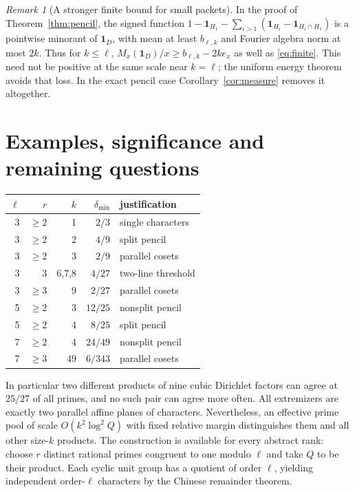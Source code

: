 \documentclass[11pt]{article}
\theoremstyle{remark}\newtheorem{remark}[theorem]{Remark}
\newcommand{\1}{\mathbf 1}
\begin{document}
\begin{remark}[A stronger finite bound for small packets]
In the proof of Theorem~\ref{thm:pencil}, the signed function $1-\1_{H_1}-\sum_{i>1}(\1_{H_i}-\1_{H_i\cap H_1})$ is a pointwise minorant of $\1_D$, with mean at least $b_{\ell,k}$ and Fourier algebra norm at most $2k$. Thus for $k\le\ell$, $M_x(\1_D)/x\ge b_{\ell,k}-2ke_x$ as well as \eqref{eq:finite}. This need not be positive at the same scale near $k=\ell$; the uniform energy theorem avoids that loss. In the exact pencil case Corollary~\ref{cor:measure} removes it altogether.
\end{remark}

\section{Examples, significance and remaining questions}
\begin{center}
\begin{tabular}{rrrrl}
\toprule
$\ell$ & $r$ & $k$ & $\delta_{\min}$ & justification\\
\midrule
3 & $\ge2$ & 1 & $2/3$ & single characters\\
3 & $\ge2$ & 2 & $4/9$ & split pencil\\
3 & $\ge2$ & 3 & $2/9$ & parallel cosets\\
3 & 3 & 6,7,8 & $4/27$ & two-line threshold\\
3 & $\ge3$ & 9 & $2/27$ & parallel cosets\\
5 & $\ge2$ & 3 & $12/25$ & nonsplit pencil\\
5 & $\ge2$ & 4 & $8/25$ & split pencil\\
7 & $\ge2$ & 4 & $24/49$ & nonsplit pencil\\
7 & $\ge3$ & 49 & $6/343$ & parallel cosets\\
\bottomrule
\end{tabular}
\end{center}
In particular two different products of nine cubic Dirichlet factors can agree at $25/27$ of all primes, and no such pair can agree more often. All extremizers are exactly two parallel affine planes of characters. Nevertheless, an effective prime pool of scale $O(k^2\log^2 Q)$ with fixed relative margin distinguishes them and all other size-$k$ products. The construction is available for every abstract rank: choose $r$ distinct rational primes congruent to one modulo $\ell$ and take $Q$ to be their product. Each cyclic unit group has a quotient of order $\ell$, yielding independent order-$\ell$ characters by the Chinese remainder theorem.
\end{document}
